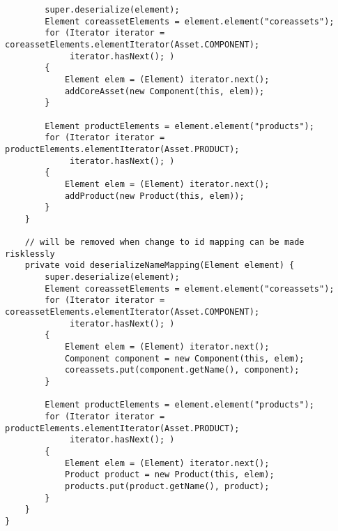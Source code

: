 \begin{verbatim}
		super.deserialize(element);
	    Element coreassetElements = element.element("coreassets");
		for (Iterator iterator = coreassetElements.elementIterator(Asset.COMPONENT);
			 iterator.hasNext(); )
		{
			Element elem = (Element) iterator.next();
			addCoreAsset(new Component(this, elem));
		}
		
		Element productElements = element.element("products");
		for (Iterator iterator = productElements.elementIterator(Asset.PRODUCT);
			 iterator.hasNext(); )
		{
			Element elem = (Element) iterator.next();
			addProduct(new Product(this, elem));
		}
	}
    
    // will be removed when change to id mapping can be made risklessly
    private void deserializeNameMapping(Element element) {
        super.deserialize(element);
        Element coreassetElements = element.element("coreassets");
        for (Iterator iterator = coreassetElements.elementIterator(Asset.COMPONENT);
             iterator.hasNext(); )
        {
            Element elem = (Element) iterator.next();
            Component component = new Component(this, elem);
            coreassets.put(component.getName(), component);
        }
        
        Element productElements = element.element("products");
        for (Iterator iterator = productElements.elementIterator(Asset.PRODUCT);
             iterator.hasNext(); )
        {
            Element elem = (Element) iterator.next();
            Product product = new Product(this, elem);
            products.put(product.getName(), product);
        }
    }
}
\end{verbatim}

